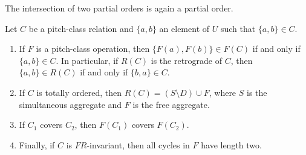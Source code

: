 \begin{theorem}
    \cite[194]{Starr1984}
    The intersection of two partial orders is again a partial order.
\end{theorem}

\begin{theorem}
    \cite[195]{Starr1984}
    \label{starr-theorem-operations}
    Let $C$ be a pitch-class relation and $\{ a, b \}$ an element of $U$ such that $\{ a, b \} \in C$.
    \begin{enumerate}
        \item If $F$ is a pitch-class operation, then $\{ F(a), F(b) \} \in F(C)$ if and only if $\{ a, b \} \in C$. In particular, if $R(C)$ is the retrograde of $C$, then $\{ a, b \} \in R(C)$ if and only if $\{ b, a \} \in C$.
        \item If $C$ is totally ordered, then $R(C) = (S \setminus D) \cup F$, where $S$ is the simultaneous aggregate and $F$ is the free aggregate.
        \item If $C_1$ covers $C_2$, then $F(C_1)$ covers $F(C_2)$.
        \item Finally, if $C$ is $FR$-invariant, then all cycles in $F$ have length two.
    \end{enumerate}
\end{theorem}

